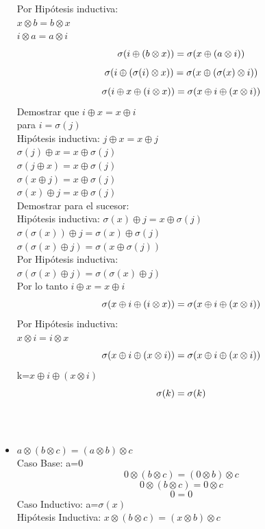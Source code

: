 \documentclass{article}
\begin{document}
\begin{itemize}
\[\]
Por Hipótesis inductiva:\\
$x \otimes b=b\otimes x$\\
$i \otimes a=a\otimes i$
\[
     \sigma(i\oplus (b \otimes x)) = \sigma(x\oplus(a \otimes i)) \\
\]
\[
     \sigma(i\oplus (\sigma(i) \otimes x)) = \sigma(x\oplus(\sigma(x) \otimes i)) \\
\]
\[
     \sigma(i\oplus x\oplus (i \otimes x)) = \sigma(x\oplus i \oplus (x \otimes i)) \\
\]
Demostrar que $i\oplus x=x\oplus i$\\
para $i=\sigma (j)$\\
Hipótesis inductiva: $j\oplus x=x\oplus j$\\
$\sigma(j)\oplus x=x\oplus \sigma(j)$\\
$\sigma(j\oplus x)=x\oplus \sigma(j)$\\
$\sigma(x\oplus j)=x\oplus \sigma(j)$\\
$\sigma(x)\oplus j=x\oplus \sigma(j)$\\
Demostrar para el sucesor:\\
Hipótesis inductiva: $\sigma(x)\oplus j=x\oplus \sigma(j)$\\
$\sigma(\sigma(x))\oplus j=\sigma(x)\oplus \sigma(j)$\\
$\sigma(\sigma(x)\oplus j)=\sigma(x\oplus \sigma(j))$\\
Por Hipótesis inductiva:\\
$\sigma(\sigma(x)\oplus j)=\sigma(\sigma(x)\oplus j)$\\
Por lo tanto $i\oplus x=x\oplus i$
\[
     \sigma(x\oplus i\oplus (i \otimes x)) = \sigma(x\oplus i \oplus (x \otimes i)) \\
\]
Por Hipótesis inductiva:\\
$x\otimes i=i\otimes x$
\[
     \sigma(x\oplus i\oplus (x \otimes i)) = \sigma(x\oplus i \oplus (x \otimes i)) \\
\]
k=$x\oplus i\oplus (x \otimes i)$
\[
     \sigma(k) = \sigma(k) \\
\]
\\\\
        \item{$a \otimes (b \otimes c)=(a\otimes b)\otimes c$}\\
\large{Caso Base:}
a=0
\[
       0 \otimes (b \otimes c)=(0\otimes b)\otimes c
\]
\[
       0 \otimes (b \otimes c)=0\otimes c
\]
\[
       0=0 
\]
\large{Caso Inductivo:}
a=$\sigma(x)$\\
Hipótesis Inductiva:
$x \otimes (b \otimes c)=(x\otimes b)\otimes c$

\end{itemize}
\end{document}
